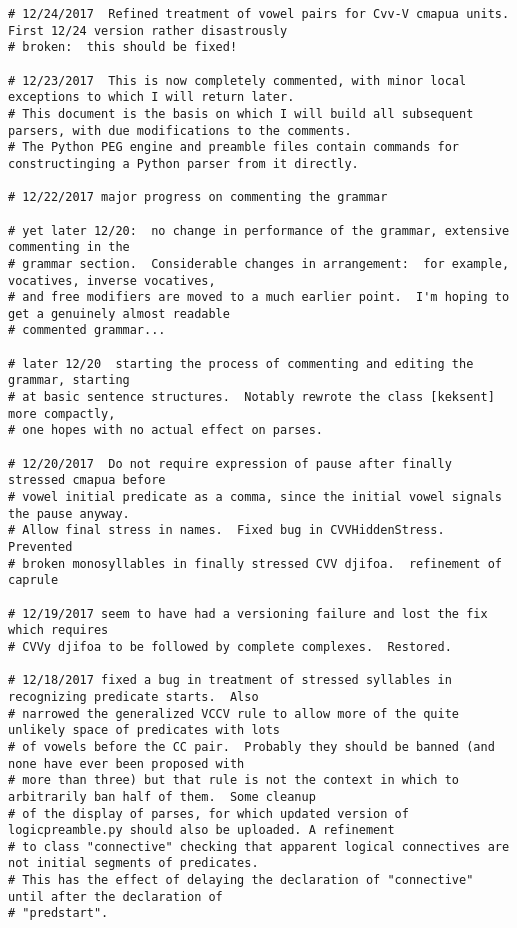 \documentclass[12pt]{book}
\begin{document}
{\begin{verbatim}
# 12/24/2017  Refined treatment of vowel pairs for Cvv-V cmapua units.  First 12/24 version rather disastrously
# broken:  this should be fixed!

# 12/23/2017  This is now completely commented, with minor local exceptions to which I will return later.
# This document is the basis on which I will build all subsequent parsers, with due modifications to the comments.
# The Python PEG engine and preamble files contain commands for constructinging a Python parser from it directly.

# 12/22/2017 major progress on commenting the grammar

# yet later 12/20:  no change in performance of the grammar, extensive commenting in the
# grammar section.  Considerable changes in arrangement:  for example, vocatives, inverse vocatives,
# and free modifiers are moved to a much earlier point.  I'm hoping to get a genuinely almost readable
# commented grammar...

# later 12/20  starting the process of commenting and editing the grammar, starting
# at basic sentence structures.  Notably rewrote the class [keksent] more compactly,
# one hopes with no actual effect on parses.

# 12/20/2017  Do not require expression of pause after finally stressed cmapua before
# vowel initial predicate as a comma, since the initial vowel signals the pause anyway.  
# Allow final stress in names.  Fixed bug in CVVHiddenStress.  Prevented
# broken monosyllables in finally stressed CVV djifoa.  refinement of caprule

# 12/19/2017 seem to have had a versioning failure and lost the fix which requires
# CVVy djifoa to be followed by complete complexes.  Restored.

# 12/18/2017 fixed a bug in treatment of stressed syllables in recognizing predicate starts.  Also
# narrowed the generalized VCCV rule to allow more of the quite unlikely space of predicates with lots
# of vowels before the CC pair.  Probably they should be banned (and none have ever been proposed with
# more than three) but that rule is not the context in which to arbitrarily ban half of them.  Some cleanup
# of the display of parses, for which updated version of logicpreamble.py should also be uploaded. A refinement
# to class "connective" checking that apparent logical connectives are not initial segments of predicates.
# This has the effect of delaying the declaration of "connective" until after the declaration of
# "predstart".


\end{verbatim}}
\end{document}
